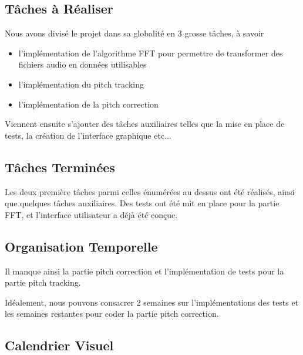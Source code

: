 \documentclass{article}
\begin{document}
\subsection{Tâches à Réaliser}

Nous avons divisé le projet dans sa globalité en 3 grosse tâches, à savoir 
\begin{itemize}
  \item l'implémentation de l'algorithme FFT pour permettre de transformer des fichiers audio en données utilisables
  \item l'implémentation du pitch tracking
  \item l'implémentation de la pitch correction
\end{itemize}

Viennent ensuite s'ajouter des tâches auxiliaires telles que la mise en place de tests, la création de l'interface graphique etc...

\subsection{Tâches Terminées}

Les deux première tâches parmi celles énumérées au dessus ont été réalisés, ainsi que quelques tâches auxiliaires. Des tests ont été mit en place pour la partie FFT, et l'interface utilisateur a déjà été conçue.

\subsection{Organisation Temporelle}

Il manque ainsi la partie pitch correction et l'implémentation de tests pour la partie pitch tracking. 
\par
Idéalement, nous pouvons consacrer 2 semaines sur l'implémentations des tests et les semaines restantes pour coder la partie pitch correction.


\subsection*{Calendrier Visuel}
\end{document}
